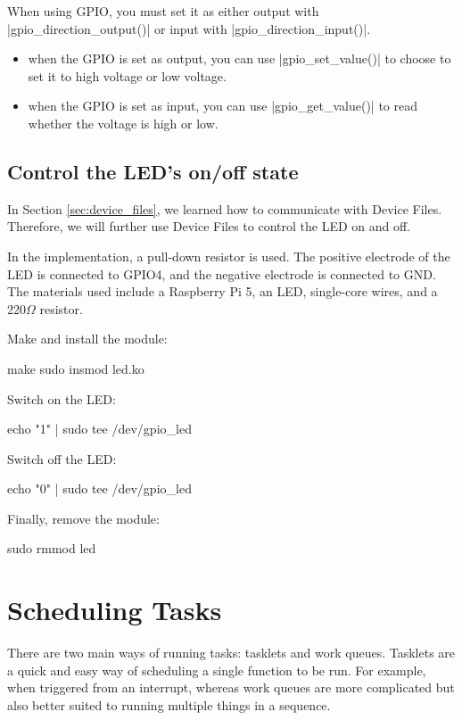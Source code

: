 \documentclass[10pt, oneside]{book}
\begin{document}
When using GPIO, you must set it as either output with \cpp|gpio_direction_output()| or input with \cpp|gpio_direction_input()|.

\begin{itemize}
  \item when the GPIO is set as output, you can use \cpp|gpio_set_value()| to choose to set it to high voltage or low voltage.
  \item when the GPIO is set as input, you can use \cpp|gpio_get_value()| to read whether the voltage is high or low.
\end{itemize}

\subsection{Control the LED's on/off state}
\label{sec:gpio_led}
In Section \ref{sec:device_files}, we learned how to communicate with Device Files.
Therefore, we will further use Device Files to control the LED on and off.

In the implementation, a pull-down resistor is used.
The positive electrode of the LED is connected to GPIO4, and the negative electrode is connected to GND.
The materials used include a Raspberry Pi 5, an LED, single-core wires, and a 220$\Omega$ resistor.


Make and install the module:
\begin{codebash}
make
sudo insmod led.ko
\end{codebash}

Switch on the LED:
\begin{codebash}
echo "1" | sudo tee /dev/gpio_led
\end{codebash}

Switch off the LED:
\begin{codebash}
echo "0" | sudo tee /dev/gpio_led
\end{codebash}

Finally, remove the module:
\begin{codebash}
sudo rmmod led
\end{codebash}

\section{Scheduling Tasks}
\label{sec:scheduling_tasks}
There are two main ways of running tasks: tasklets and work queues.
Tasklets are a quick and easy way of scheduling a single function to be run.
For example, when triggered from an interrupt, whereas work queues are more complicated but also better suited to running multiple things in a sequence.
\end{document}
